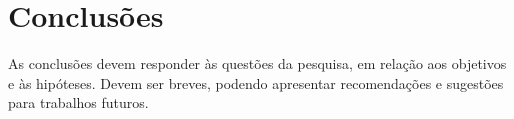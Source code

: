 \chapter{Conclusões}\label{cap6}

As conclusões devem responder às questões da pesquisa, em relação aos objetivos e às hipóteses. Devem ser breves, podendo apresentar recomendações e sugestões para trabalhos futuros.


